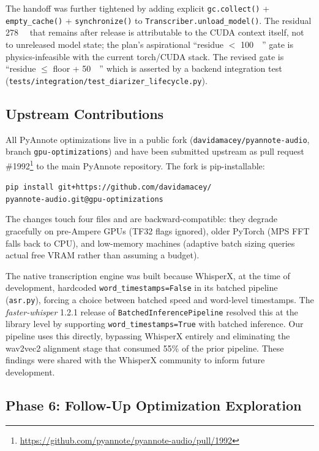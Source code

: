 \documentclass[conference,10pt]{IEEEtran}
\begin{document}
The handoff was further tightened by adding explicit
\texttt{gc.collect()} + \texttt{empty\_cache()} + \texttt{synchronize()}
to \texttt{Transcriber.unload\_model()}. The residual \SI{278}{\mega\byte}
that remains after release is attributable to the CUDA context itself,
not to unreleased model state; the plan's aspirational
``residue $<$ \SI{100}{\mega\byte}'' gate is physics-infeasible with
the current torch/CUDA stack. The revised gate is
``residue $\le$ floor + \SI{50}{\mega\byte}'' which is asserted by a
backend integration test
(\texttt{tests/integration/test\_diarizer\_lifecycle.py}).

\subsection{Upstream Contributions}

All PyAnnote optimizations live in a public fork
(\texttt{davidamacey/pyannote-audio}, branch \texttt{gpu-optimizations}) and
have been submitted upstream as pull request
\#1992\footnote{\url{https://github.com/pyannote/pyannote-audio/pull/1992}}
to the main PyAnnote repository. The fork is pip-installable:

\smallskip
\noindent\texttt{pip install git+https://github.com/davidamacey/\\pyannote-audio.git@gpu-optimizations}
\smallskip

The changes touch four files and are backward-compatible: they degrade
gracefully on pre-Ampere GPUs (TF32 flags ignored), older PyTorch (MPS FFT
falls back to CPU), and low-memory machines (adaptive batch sizing queries
actual free VRAM rather than assuming a budget).

The native transcription engine was built because WhisperX, at the time of
development, hardcoded \texttt{word\_timestamps=False} in its batched pipeline
(\texttt{asr.py}), forcing a choice between batched speed and word-level
timestamps. The \textit{faster-whisper} 1.2.1 release of
\texttt{BatchedInferencePipeline} resolved this at the library level by
supporting \texttt{word\_timestamps=True} with batched inference. Our pipeline
uses this directly, bypassing WhisperX entirely and eliminating the wav2vec2
alignment stage that consumed 55\% of the prior pipeline. These findings were
shared with the WhisperX community to inform future development.

\subsection{Phase 6: Follow-Up Optimization Exploration}
\end{document}

